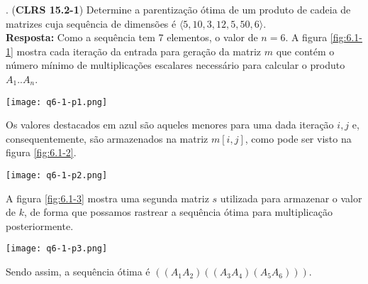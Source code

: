 
. (\textbf{CLRS 15.2-1}) Determine a parentização ótima de um produto de cadeia de matrizes cuja sequência de dimensões é $\langle 5, 10, 3, 12, 5, 50, 6 \rangle$.\\[6pt]
\textbf{Resposta:} Como a sequência tem 7 elementos, o valor de $n = 6$. A figura \ref{fig:6.1-1} mostra cada iteração da entrada para geração da matriz $m$ que contém o número mínimo de multiplicações escalares necessário para calcular o produto $A_1..A_n$.

\begin{center}
\texttt{[image: q6-1-p1.png]}
\label{fig:6.1-1}
\end{center}

Os valores destacados em azul são aqueles menores para uma dada iteração $i, j$ e, consequentemente, são armazenados na matriz $m[i, j]$, como pode ser visto na figura \ref{fig:6.1-2}.
\begin{center}
\texttt{[image: q6-1-p2.png]}
\label{fig:6.1-2}
\end{center}

A figura \ref{fig:6.1-3} mostra uma segunda matriz $s$ utilizada para armazenar o valor de $k$, de forma que possamos rastrear a sequência ótima para multiplicação posteriormente.
\begin{center}
\texttt{[image: q6-1-p3.png]}
\label{fig:6.1-3}
\end{center}

Sendo assim, a sequência ótima é $( (A_1 A_2) ((A_3 A_4) (A_5 A_6)) )$.\\[12pt]
